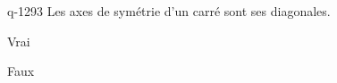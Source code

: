 \begin{truefalse}{q-1293}
Les axes de symétrie d'un carré sont ses diagonales.
\item Vrai
\item* Faux
\end{truefalse}


